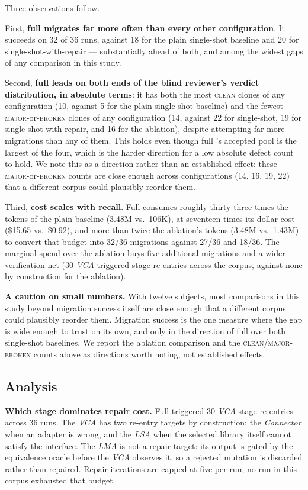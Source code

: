 Three observations follow.

First, \textbf{full \sys migrates far more often than every other configuration}. It succeeds on 32 of 36 runs, against 18 for the plain single-shot baseline and 20 for single-shot-with-repair — substantially ahead of both, and among the widest gaps of any comparison in this study.

Second, \textbf{full \sys leads on both ends of the blind reviewer's verdict distribution, in absolute terms}: it has both the most \textsc{clean} clones of any configuration (10, against 5 for the plain single-shot baseline) and the fewest \textsc{major}-or-\textsc{broken} clones of any configuration (14, against 22 for single-shot, 19 for single-shot-with-repair, and 16 for the ablation), despite attempting far more migrations than any of them. This holds even though full \sys's accepted pool is the largest of the four, which is the harder direction for a low absolute defect count to hold. We note this as a direction rather than an established effect: these \textsc{major}-or-\textsc{broken} counts are close enough across configurations (14, 16, 19, 22) that a different corpus could plausibly reorder them.

Third, \textbf{cost scales with recall}. Full \sys consumes roughly thirty-three times the tokens of the plain baseline (3.48M vs.\ 106K), at seventeen times its dollar cost (\$15.65 vs.\ \$0.92), and more than twice the ablation's tokens (3.48M vs.\ 1.43M) to convert that budget into 32/36 migrations against 27/36 and 18/36. The marginal spend over the ablation buys five additional migrations and a wider verification net (30 \emph{VCA}-triggered stage re-entries across the corpus, against none by construction for the ablation).

\textbf{A caution on small numbers.} With twelve subjects, most comparisons in this study beyond migration success itself are close enough that a different corpus could plausibly reorder them. Migration success is the one measure where the gap is wide enough to trust on its own, and only in the direction of full \sys over both single-shot baselines. We report the ablation comparison and the \textsc{clean}/\textsc{major}-\textsc{broken} counts above as directions worth noting, not established effects.

\subsection{Analysis}

\textbf{Which stage dominates repair cost.} Full \sys triggered 30 \emph{VCA} stage re-entries across 36 runs. The \emph{VCA} has two re-entry targets by construction: the \emph{Connector} when an adapter is wrong, and the \emph{LSA} when the selected library itself cannot satisfy the interface. The \emph{LMA} is not a repair target: its output is gated by the equivalence oracle before the \emph{VCA} observes it, so a rejected mutation is discarded rather than repaired. Repair iterations are capped at five per run; no run in this corpus exhausted that budget.

